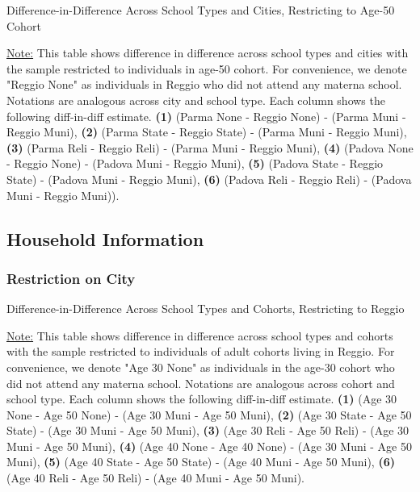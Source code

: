 \documentclass[11pt]{article}
\begin{document}
\begin{table}[H]
\begin{center}
	\caption{Difference-in-Difference Across School Types and Cities, Restricting to Age-50 Cohort} \label{table:WCh-50}
	\scalebox{0.80}{
		}
\end{center}
\footnotesize
\underline{Note:} This table shows difference in difference across school types and cities with the sample restricted to individuals in age-50 cohort. For convenience, we denote "Reggio None" as individuals in Reggio who did not attend any materna school. Notations are analogous across city and school type. Each column shows the following diff-in-diff estimate. \textbf{(1)} (Parma None - Reggio None) - (Parma Muni - Reggio Muni), \textbf{(2)} (Parma State - Reggio State) - (Parma Muni - Reggio Muni), \textbf{(3)} (Parma Reli - Reggio Reli) - (Parma Muni - Reggio Muni), \textbf{(4)} (Padova None - Reggio None) - (Padova Muni - Reggio Muni),  \textbf{(5)} (Padova State - Reggio State) - (Padova Muni - Reggio Muni), \textbf{(6)} (Padova Reli - Reggio Reli) - (Padova Muni - Reggio Muni)). 
\end{table}






\subsection{Household Information}
\subsubsection{Restriction on City}
\begin{table}[H]
\begin{center}
	\caption{Difference-in-Difference Across School Types and Cohorts, Restricting to Reggio} \label{table:LC-Reggio}
	\scalebox{0.80}{
		}
\end{center}
\footnotesize
\underline{Note:} This table shows difference in difference across school types and cohorts with the sample restricted to individuals of adult cohorts living in Reggio. For convenience, we denote "Age 30 None" as individuals in the age-30 cohort who did not attend any materna school. Notations are analogous across cohort and school type. Each column shows the following diff-in-diff estimate. \textbf{(1)} (Age 30 None - Age 50 None) - (Age 30 Muni - Age 50 Muni), \textbf{(2)} (Age 30 State - Age 50 State) - (Age 30 Muni - Age 50 Muni), \textbf{(3)} (Age 30 Reli - Age 50 Reli) - (Age 30 Muni - Age 50 Muni), \textbf{(4)} (Age 40 None - Age 40 None) - (Age 30 Muni - Age 50 Muni),  \textbf{(5)} (Age 40 State - Age 50 State) - (Age 40 Muni - Age 50 Muni), \textbf{(6)} (Age 40 Reli - Age 50 Reli) - (Age 40 Muni - Age 50 Muni). 
\end{table}
\end{document}
